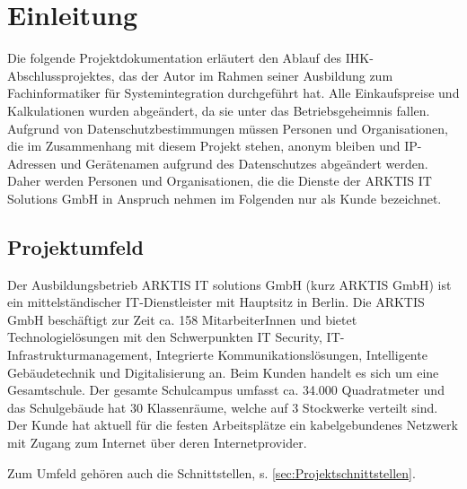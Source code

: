 \newpage
\section{Einleitung}
\label{sec:Einleitung}
Die folgende Projektdokumentation erläutert den Ablauf des IHK-Abschlussprojektes, das der Autor im Rahmen seiner Ausbildung zum Fachinformatiker für Systemintegration durchgeführt hat. Alle Einkaufspreise und Kalkulationen wurden abgeändert, da sie unter das Betriebsgeheimnis fallen. Aufgrund von Datenschutzbestimmungen müssen Personen und Organisationen, die im Zusammenhang mit diesem Projekt stehen, anonym bleiben und IP-Adressen und Gerätenamen aufgrund des Datenschutzes abgeändert werden. Daher werden Personen und Organisationen, die die Dienste der ARKTIS IT Solutions GmbH in Anspruch nehmen im Folgenden nur als Kunde bezeichnet. 

\subsection{Projektumfeld} 
\label{sec:Projektumfeld}
Der Ausbildungsbetrieb ARKTIS IT solutions GmbH (kurz ARKTIS GmbH) ist ein mittelständischer IT-Dienstleister mit Hauptsitz in Berlin. Die ARKTIS GmbH beschäftigt zur Zeit ca. 158 MitarbeiterInnen und bietet Technologielösungen mit den Schwerpunkten IT Security, IT-Infrastrukturmanagement, Integrierte Kommunikationslösungen, Intelligente Gebäudetechnik und Digitalisierung an. Beim Kunden handelt es sich um eine Gesamtschule. Der gesamte Schulcampus umfasst ca. 34.000 Quadratmeter und das Schulgebäude hat 30 Klassenräume, welche auf 3 Stockwerke verteilt sind. Der Kunde hat aktuell für die festen Arbeitsplätze ein kabelgebundenes Netzwerk mit Zugang zum Internet über deren Internetprovider.   

Zum Umfeld gehören auch die Schnittstellen, s. \ref{sec:Projektschnittstellen}.

